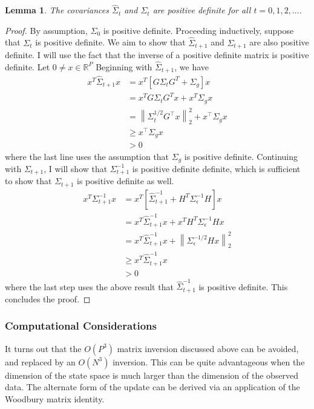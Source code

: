 \documentclass[12pt]{article}
\newcommand*{\norm}[1]{\left\lVert#1\right\rVert}
\newcommand{\R}{\mathbb{R}}
\newtheorem{lemma}{Lemma}
\begin{document}
\begin{lemma} 
The covariances $\hat{\Sigma}_t$ and $\Sigma_t$ are positive definite for all $t = 0, 1, 2, \dots$. 
\end{lemma}

\begin{proof}
By assumption, $\Sigma_0$ is positive definite. Proceeding inductively, suppose that $\Sigma_t$ is positive definite. We aim to show that $\hat{\Sigma}_{t+1}$
and $\Sigma_{t + 1}$ are also positive definite. I will use the fact that the inverse of a positive definite matrix is positive definite. Let $0 \neq x \in \R^P$ 
Beginning with $\hat{\Sigma}_{t+1}$, we have 
\begin{align*}
x^T \hat{\Sigma}_{t+1} x &= x^T \left[G \Sigma_t G^T + \Sigma_g \right] x \\
				      &= x^T G \Sigma_t G^T x + x^T \Sigma_g x \\
				      &= \norm{\Sigma_t^{1/2}G^\top x}_2^2 + x^\top \Sigma_g x \\
				      &\geq x^\top \Sigma_g x \\
				      &> 0
\end{align*}
where the last line uses the assumption that $\Sigma_g$ is positive definite. Continuing with $\Sigma_{t+1}$, I will show that $\Sigma^{-1}_{t+1}$
is positive definite definite, which is sufficient to show that $\Sigma_{t+1}$ is positive definite as well. 
\begin{align*}
x^T \Sigma_{t + 1}^{-1} x &= x^T \left[\hat{\Sigma}^{-1}_{t+1} + H^T \Sigma_\epsilon^{-1}H \right] x \\
				       &= x^T \hat{\Sigma}^{-1}_{t+1} x + x^T H^T \Sigma_\epsilon^{-1}H x \\
				       &= x^T \hat{\Sigma}^{-1}_{t+1} x + \norm{\Sigma_\epsilon^{-1/2} H x}_2^2 \\
				       &\geq x^T \hat{\Sigma}^{-1}_{t+1} x \\
				       &> 0
\end{align*}
where the last step uses the above result that $\hat{\Sigma}^{-1}_{t+1}$ is positive definite. This concludes the proof. 
\end{proof}

\subsubsection{Computational Considerations}
It turns out that the $O(P^3)$ matrix inversion discussed above can be avoided, and replaced by an $O(N^3)$ inversion. This can be quite advantageous 
when the dimension of the state space is much larger than the dimension of the observed data. The alternate form of the update can be derived via an 
application of the Woodbury matrix identity. 
\end{document}
